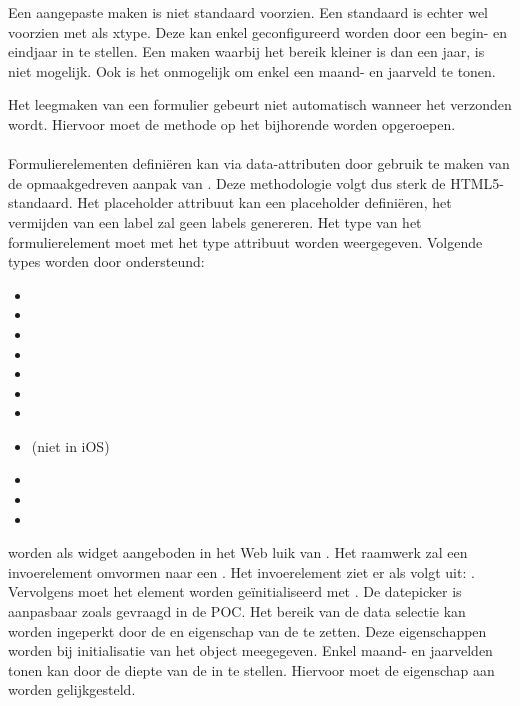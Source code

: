 Een aangepaste  maken is niet standaard voorzien.
Een standaard  is echter wel voorzien met  als xtype.
Deze kan enkel geconfigureerd worden door een begin- en eindjaar in te stellen.
Een  maken waarbij het bereik kleiner is dan een jaar, is niet mogelijk.
Ook is het onmogelijk om enkel een maand- en jaarveld te tonen.

Het leegmaken van een formulier gebeurt niet automatisch wanneer het verzonden wordt.
Hiervoor moet de  methode op het bijhorende  worden opgeroepen.

\paragraph{\kendo}
 Formulierelementen definiëren kan via data-attributen door gebruik te maken van de opmaakgedreven aanpak van \kendo.
 Deze methodologie volgt dus sterk de HTML5-standaard.
 Het placeholder attribuut kan een placeholder definiëren,  het vermijden van een label zal geen labels genereren.
 Het type van het formulierelement moet met het type attribuut worden weergegeven.
 Volgende types worden door \kendo{} ondersteund:
 \begin{itemize}
  \item {}
  \item {}
  \item {}
  \item {}
  \item {}
  \item {}
  \item {}
  \item {} (niet in iOS)
  \item {}
  \item {} 
  \item {}
 \end{itemize}

  worden als widget aangeboden in het Web luik van \kendo{}.
 Het raamwerk zal een invoerelement omvormen naar een .
 Het invoerelement ziet er als volgt uit: .  
 Vervolgens moet het element worden geïnitialiseerd met .
 De datepicker is aanpasbaar zoals gevraagd in de POC.
 Het bereik van de data selectie kan worden ingeperkt door de  en  eigenschap van de  te zetten.
 Deze eigenschappen worden bij initialisatie van het object meegegeven.
 Enkel maand- en jaarvelden tonen kan door de diepte van de  in te stellen.
 Hiervoor moet de eigenschap  aan  worden gelijkgesteld.
 

